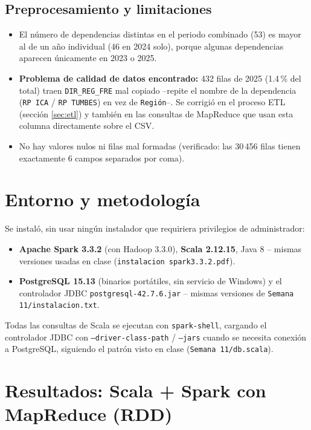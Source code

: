 \documentclass[10pt,a4paper]{article}
\theoremstyle{definition}
\begin{document}
\subsection{Preprocesamiento y limitaciones}
\begin{itemize}
  \item El n\'umero de dependencias distintas en el periodo combinado (53) es mayor al de un a\~no
    individual (46 en 2024 solo), porque algunas dependencias aparecen \'unicamente en 2023 o 2025.
  \item \textbf{Problema de calidad de datos encontrado:} 432 filas de 2025 (1.4\,\% del total) traen
    \texttt{DIR\_REG\_FRE} mal copiado --repite el nombre de la dependencia (\texttt{RP ICA} /
    \texttt{RP TUMBES}) en vez de \texttt{Regi\'on}--. Se corrigi\'o en el proceso ETL (secci\'on
    \ref{sec:etl}) y tambi\'en en las consultas de MapReduce que usan esta columna directamente sobre el
    CSV.
  \item No hay valores nulos ni filas mal formadas (verificado: las 30\,456 filas tienen exactamente 6
    campos separados por coma).
\end{itemize}

\section{Entorno y metodolog\'ia}
Se instal\'o, sin usar ning\'un instalador que requiriera privilegios de administrador:
\begin{itemize}
  \item \textbf{Apache Spark 3.3.2} (con Hadoop 3.3.0), \textbf{Scala 2.12.15}, Java 8 -- mismas
    versiones usadas en clase (\texttt{instalacion spark3.3.2.pdf}).
  \item \textbf{PostgreSQL 15.13} (binarios port\'atiles, sin servicio de Windows) y el controlador JDBC
    \texttt{postgresql-42.7.6.jar} -- mismas versiones de \texttt{Semana 11/instalacion.txt}.
\end{itemize}
Todas las consultas de Scala se ejecutan con \texttt{spark-shell}, cargando el controlador JDBC con
\texttt{--driver-class-path} / \texttt{--jars} cuando se necesita conexi\'on a PostgreSQL, siguiendo el
patr\'on visto en clase (\texttt{Semana 11/db.scala}).

\section{Resultados: Scala + Spark con MapReduce (RDD)}
\end{document}
